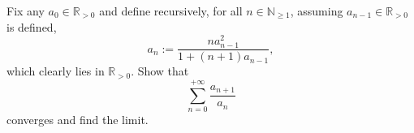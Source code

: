 \begin{problem}
    Fix any \( a_0 \in \mathbb{R}_{>0} \) and define recursively, for all \( n \in \mathbb{N}_{\geq 1} \), assuming \( a_{n-1} \in \mathbb{R}_{>0} \) is defined,
    \[
        a_n := \frac{n a_{n-1}^2}{1 + \left(n+1\right) a_{n-1}},
    \]
    which clearly lies in \( \mathbb{R}_{>0} \). Show that
    \[
        \sum_{n=0}^{+\infty} \frac{a_{n+1}}{a_n}
    \]
    converges and find the limit.
\end{problem}
